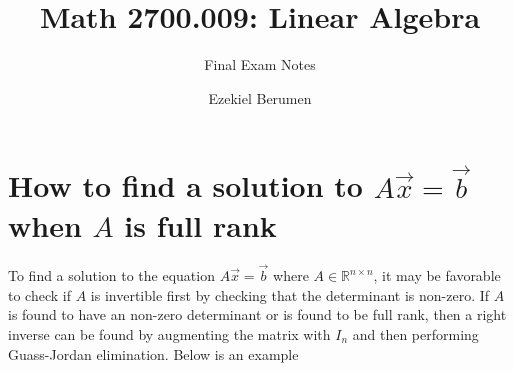 \documentclass{report}
\title{Math 2700.009: Linear Algebra}
\subtitle{Final Exam Notes}
\author{Ezekiel Berumen}
\date{}
\begin{document}
\maketitle
\newpage%
\tableofcontents
\pagebreak

\section{How to find a solution to $A\vec{x} = \vec{b}$ when $A$ is full rank}
\noindent To find a solution to the equation $A\vec{x} = \vec{b}$ where $A\in\mathbb{R}^{n\times n}$, it may be favorable to check if $A$ is invertible first by checking that the determinant is non-zero. If $A$ is found to have an non-zero determinant or is found to be full rank, then a right inverse can be found by augmenting the matrix with $I_n$ and then performing Guass-Jordan elimination. Below is an example
\end{document}
